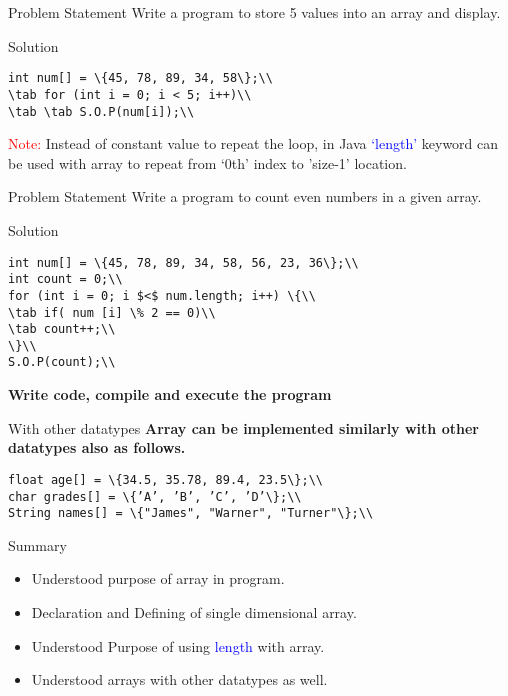 \documentclass[aspectratio=169,14pt,usenames,dvipsnames]{beamer}
\newcommand\tab[1][1cm]{\hspace*{#1}}
\begin{document}
\begin{frame}{Problem Statement}
Write a program to store 5 values into an array and
display.
\end{frame}

\begin{frame}{Solution}
\begin{lstlisting}
int num[] = \{45, 78, 89, 34, 58\};\\
\tab for (int i = 0; i < 5; i++)\\
\tab \tab S.O.P(num[i]);\\
\end{lstlisting}
\vspace{0.8em}
\textcolor{red}{Note:} Instead of constant value to repeat the loop, in Java \textcolor{blue}{‘length’} keyword can be used with array to repeat from ‘0th’ index to ’size-1’ location.
\end{frame}

\begin{frame}{Problem Statement}
Write a program to count even numbers in a given array.
\end{frame}

\begin{frame}{Solution}
\begin{lstlisting}
int num[] = \{45, 78, 89, 34, 58, 56, 23, 36\};\\
int count = 0;\\
for (int i = 0; i $<$ num.length; i++) \{\\
\tab if( num [i] \% 2 == 0)\\
\tab count++;\\
\}\\
S.O.P(count);\\
\end{lstlisting}
\vspace{0.8em}
\textbf{Write code, compile and execute the program}
\end{frame}

\begin{frame}{With other datatypes}
\textbf{Array can be implemented similarly with other datatypes
also as follows.}\\
\vspace{0.8em}
\begin{lstlisting}
float age[] = \{34.5, 35.78, 89.4, 23.5\};\\
char grades[] = \{’A’, ’B’, ’C’, ’D’\};\\
String names[] = \{"James", "Warner", "Turner"\};\\
\end{lstlisting}
\end{frame}

\begin{frame}{Summary}
\begin{itemize}
    \item Understood purpose of array in program.
\item Declaration and Defining of single dimensional array.
\item Understood Purpose of using \textcolor{blue}{length} with array.
\item Understood arrays with other datatypes as well.
\end{itemize}
\end{frame}
\end{document}
